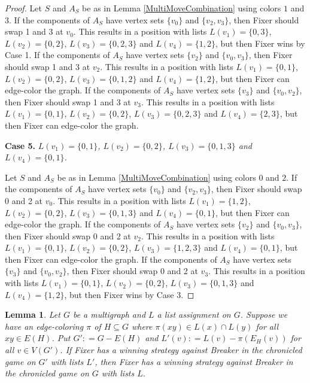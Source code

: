 \documentclass[12pt]{amsart}
\theoremstyle{plain}
\newtheorem{lem}[thm]{Lemma}
\theoremstyle{definition}
\theoremstyle{remark}
\newcommand{\DefinedAs}{\mathrel{\mathop:}=}
\begin{document}
\begin{proof}
Let $S$ and $A_S$ be as in Lemma \ref{MultiMoveCombination} using colors $1$ and $3$. If the components of $A_S$ have vertex sets $\{v_0\}$ and $\{v_2, v_3\}$, then Fixer should swap 1 and 3 at $v_0$. This results in a position with lists $L(v_1) = \{0, 3\}$, $L(v_2) = \{0, 2\}$, $L(v_3) = \{0, 2, 3\}$ and $L(v_4) = \{1, 2\}$, but then Fixer wins by Case 1. If the components of $A_S$ have vertex sets $\{v_2\}$ and $\{v_0, v_3\}$, then Fixer should swap 1 and 3 at $v_2$. This results in a position with lists $L(v_1) = \{0, 1\}$, $L(v_2) = \{0, 2\}$, $L(v_3) = \{0, 1, 2\}$ and $L(v_4) = \{1, 2\}$, but then Fixer can edge-color the graph. If the components of $A_S$ have vertex sets $\{v_3\}$ and $\{v_0, v_2\}$, then Fixer should swap 1 and 3 at $v_3$. This results in a position with lists $L(v_1) = \{0, 1\}$, $L(v_2) = \{0, 2\}$, $L(v_3) = \{0, 2, 3\}$ and $L(v_4) = \{2, 3\}$, but then Fixer can edge-color the graph. 

\noindent\textbf{Case 5.  }\textit{$L(v_1) = \{0, 1\}$, $L(v_2) = \{0, 2\}$, $L(v_3) = \{0, 1, 3\}$ and $L(v_4) = \{0, 1\}$.}

Let $S$ and $A_S$ be as in Lemma \ref{MultiMoveCombination} using colors $0$ and $2$. If the components of $A_S$ have vertex sets $\{v_0\}$ and $\{v_2, v_3\}$, then Fixer should swap 0 and 2 at $v_0$. This results in a position with lists $L(v_1) = \{1, 2\}$, $L(v_2) = \{0, 2\}$, $L(v_3) = \{0, 1, 3\}$ and $L(v_4) = \{0, 1\}$, but then Fixer can edge-color the graph. If the components of $A_S$ have vertex sets $\{v_2\}$ and $\{v_0, v_3\}$, then Fixer should swap 0 and 2 at $v_2$. This results in a position with lists $L(v_1) = \{0, 1\}$, $L(v_2) = \{0, 2\}$, $L(v_3) = \{1, 2, 3\}$ and $L(v_4) = \{0, 1\}$, but then Fixer can edge-color the graph. If the components of $A_S$ have vertex sets $\{v_3\}$ and $\{v_0, v_2\}$, then Fixer should swap 0 and 2 at $v_3$. This results in a position with lists $L(v_1) = \{0, 1\}$, $L(v_2) = \{0, 2\}$, $L(v_3) = \{0, 1, 3\}$ and $L(v_4) = \{1, 2\}$, but then Fixer wins by Case 3. 

\end{proof}


\begin{lem}\label{CanColorAndPlayOnRest}
Let $G$ be a multigraph and $L$ a list assignment on $G$.  Suppose we have an edge-coloring $\pi$ of $H \subseteq G$ where $\pi(xy) \in L(x) \cap L(y)$ for all $xy \in E(H)$.  Put $G' \DefinedAs G - E(H)$ and 
$L'(v) \DefinedAs L(v) - \pi(E_H(v))$ for all $v \in V(G')$.  If Fixer has a winning strategy against Breaker in the chronicled game on $G'$ with lists $L'$, then Fixer has a winning strategy against Breaker in the chronicled game on $G$ with lists $L$.
\end{lem}
\end{document}
